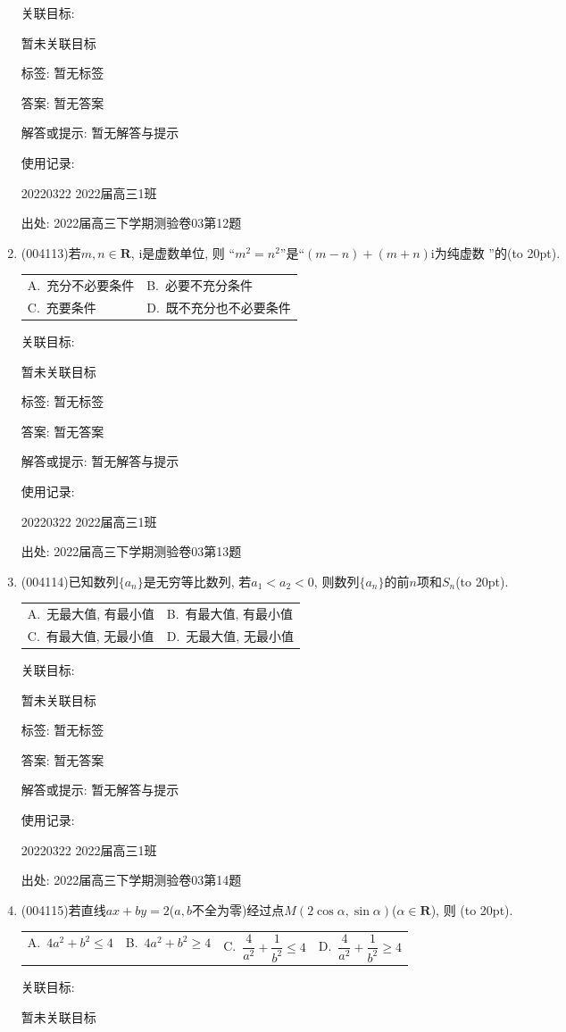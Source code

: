 \documentclass[10pt,a4paper]{article}
\newcommand{\bracket}[1]{(\hbox to #1pt{})}
\newcommand{\twoch}[4]{\par\begin{tabular}{p{.46\textwidth}p{.46\textwidth}}
A.~#1& B.~#2\\
C.~#3& D.~#4
\end{tabular}}
\newcommand{\fourch}[4]{\par\begin{tabular}{p{.23\textwidth}p{.23\textwidth}p{.23\textwidth}p{.23\textwidth}}
A.~#1 &B.~#2& C.~#3& D.~#4
\end{tabular}}
\begin{document}
\begin{enumerate}[1.]
关联目标:

暂未关联目标



标签: 暂无标签

答案: 暂无答案

解答或提示: 暂无解答与提示

使用记录:

20220322	2022届高三1班	


出处: 2022届高三下学期测验卷03第12题
\item { (004113)}若$m,n\in \mathbf{R}$, $\mathrm{i}$是虚数单位, 则 ``$m^2=n^2$''是``$(m-n)+(m+n)\mathrm{i}$为纯虚数 ''的\bracket{20}.
\twoch{充分不必要条件}{必要不充分条件}{充要条件}{既不充分也不必要条件}


关联目标:

暂未关联目标



标签: 暂无标签

答案: 暂无答案

解答或提示: 暂无解答与提示

使用记录:

20220322	2022届高三1班	


出处: 2022届高三下学期测验卷03第13题
\item { (004114)}已知数列$\{a_n\}$是无穷等比数列, 若$a_1<a_2<0$, 则数列$\{a_n\}$的前$n$项和$S_n$\bracket{20}.
\twoch{无最大值, 有最小值}{有最大值, 有最小值}{有最大值, 无最小值}{无最大值, 无最小值}


关联目标:

暂未关联目标



标签: 暂无标签

答案: 暂无答案

解答或提示: 暂无解答与提示

使用记录:

20220322	2022届高三1班	


出处: 2022届高三下学期测验卷03第14题
\item { (004115)}若直线$ax+by=2$($a,b$不全为零)经过点$M(2\cos \alpha ,\sin \alpha)$($\alpha \in \mathbf{R}$), 则	\bracket{20}.
\fourch{$4a^2+b^2\le 4$}{$4a^2+b^2\ge 4$}{$\dfrac 4{a^2}+\dfrac 1{b^2}\le 4$}{$\dfrac 4{a^2}+\dfrac 1{b^2}\ge 4$}


关联目标:

暂未关联目标




\end{enumerate}
\end{document}

